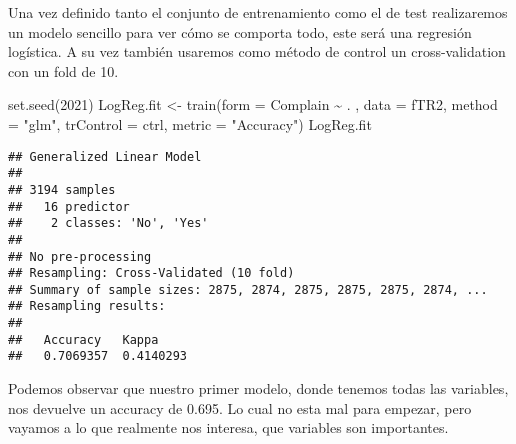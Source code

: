 \documentclass[
]{article}
\newenvironment{Shaded}{\begin{snugshade}}{\end{snugshade}}
\newcommand{\AttributeTok}[1]{\textcolor[rgb]{0.77,0.63,0.00}{#1}}
\newcommand{\ConstantTok}[1]{\textcolor[rgb]{0.00,0.00,0.00}{#1}}
\newcommand{\DecValTok}[1]{\textcolor[rgb]{0.00,0.00,0.81}{#1}}
\newcommand{\FloatTok}[1]{\textcolor[rgb]{0.00,0.00,0.81}{#1}}
\newcommand{\FunctionTok}[1]{\textcolor[rgb]{0.00,0.00,0.00}{#1}}
\newcommand{\NormalTok}[1]{#1}
\newcommand{\OtherTok}[1]{\textcolor[rgb]{0.56,0.35,0.01}{#1}}
\newcommand{\SpecialCharTok}[1]{\textcolor[rgb]{0.00,0.00,0.00}{#1}}
\newcommand{\StringTok}[1]{\textcolor[rgb]{0.31,0.60,0.02}{#1}}
\begin{document}
\begin{Shaded}
\end{Shaded}

\newpage

Una vez definido tanto el conjunto de entrenamiento como el de test
realizaremos un modelo sencillo para ver cómo se comporta todo, este
será una regresión logística. A su vez también usaremos como método de
control un cross-validation con un fold de 10.

\begin{Shaded}
\begin{Highlighting}[]
\FunctionTok{set.seed}\NormalTok{(}\DecValTok{2021}\NormalTok{)}
\NormalTok{LogReg.fit }\OtherTok{\textless{}{-}} \FunctionTok{train}\NormalTok{(}\AttributeTok{form =}\NormalTok{ Complain }\SpecialCharTok{\textasciitilde{}}\NormalTok{ . , }\AttributeTok{data =}\NormalTok{ fTR2, }\AttributeTok{method =} \StringTok{"glm"}\NormalTok{, }
                    \AttributeTok{trControl =}\NormalTok{ ctrl, }\AttributeTok{metric =} \StringTok{"Accuracy"}\NormalTok{)  }
\NormalTok{LogReg.fit  }
\end{Highlighting}
\end{Shaded}

\begin{verbatim}
## Generalized Linear Model 
## 
## 3194 samples
##   16 predictor
##    2 classes: 'No', 'Yes' 
## 
## No pre-processing
## Resampling: Cross-Validated (10 fold) 
## Summary of sample sizes: 2875, 2874, 2875, 2875, 2875, 2874, ... 
## Resampling results:
## 
##   Accuracy   Kappa    
##   0.7069357  0.4140293
\end{verbatim}

Podemos observar que nuestro primer modelo, donde tenemos todas las
variables, nos devuelve un accuracy de 0.695. Lo cual no esta mal para
empezar, pero vayamos a lo que realmente nos interesa, que variables son
importantes.
\end{document}
